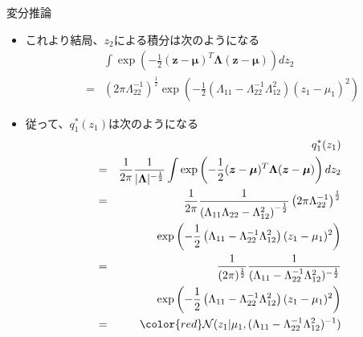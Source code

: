 \documentclass[dvipdfmx,notheorems,t]{beamer}
\begin{document}
\begin{frame}{変分推論}
\begin{itemize}
\begin{itemize}
		\item これより結局、$z_2$による積分は次のようになる
		\begin{eqnarray}
			&& \int \exp \left( -\frac{1}{2} (\bm{z} - \bm{\mu})^T \bm{\Lambda} (\bm{z} - \bm{\mu}) \right) dz_2 \nonumber \\
			&=& \left( 2\pi \Lambda_{22}^{-1} \right)^\frac{1}{2} \exp \left( -\frac{1}{2} \left( \Lambda_{11} - \Lambda_{22}^{-1} \Lambda_{12}^2 \right) (z_1 - \mu_1)^2 \right)
		\end{eqnarray}
		
		\item 従って、$q_1^*(z_1)$は次のようになる
		\begin{eqnarray}
			&& q_1^*(z_1) \nonumber \\
			&=& \frac{1}{2\pi} \frac{1}{|\bm{\Lambda}|^{-\frac{1}{2}}} \int \exp \left( -\frac{1}{2} (\bm{z} - \bm{\mu})^T \bm{\Lambda} (\bm{z} - \bm{\mu}) \right) dz_2 \\
			&=& \frac{1}{2\pi} \frac{1}{\left( \Lambda_{11} \Lambda_{22} - \Lambda_{12}^2 \right)^{-\frac{1}{2}}} \left( 2\pi \Lambda_{22}^{-1} \right)^\frac{1}{2} \nonumber \\
			&& \qquad \exp \left( -\frac{1}{2} \left( \Lambda_{11} - \Lambda_{22}^{-1} \Lambda_{12}^2 \right) (z_1 - \mu_1)^2 \right) \\
			&=& \frac{1}{(2\pi)^\frac{1}{2}} \frac{1}{(\Lambda_{11} - \Lambda_{22}^{-1} \Lambda_{12}^2)^{-\frac{1}{2}}} \nonumber \\
			&& \qquad \exp \left( -\frac{1}{2} \left( \Lambda_{11} - \Lambda_{22}^{-1} \Lambda_{12}^2 \right) (z_1 - \mu_1)^2 \right) \\
			&=& \color{red}\mathcal{N}(z_1 | \mu_1, (\Lambda_{11} - \Lambda_{22}^{-1} \Lambda_{12}^2)^{-1})\normalcolor
		\end{eqnarray}
		

\end{itemize}
\end{itemize}
\end{frame}
\end{document}

